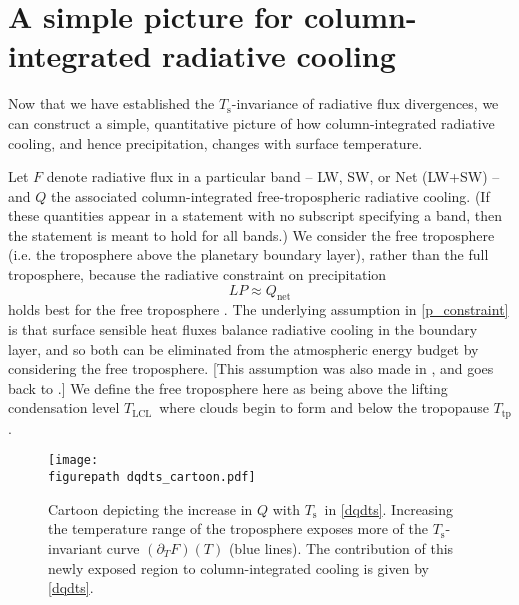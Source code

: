 \documentclass[9pt,twocolumn,twoside,lineno]{pnas-new}
\newcommand{\beqn}{\begin{equation}}
\newcommand{\eeqn}{\end{equation}}
\newcommand{\ppt}{\ensuremath{\partial_T}}
\newcommand{\Qnet}{\ensuremath{Q_\mathrm{net}}}
\newcommand{\Ts}{\ensuremath{T_\mathrm{s}}}
\newcommand{\Tlcl}{\ensuremath{T_\mathrm{LCL}}}
\newcommand{\Ttp}{\ensuremath{T_\mathrm{tp}}}
\newcommand{\figurepath}{./}
\begin{document}
		
\section{A simple picture for column-integrated radiative cooling} \label{sec_simple_Q}

Now that we have established  the \Ts-invariance of radiative flux divergences, we can construct a simple, quantitative picture of how column-integrated radiative cooling, and hence precipitation,  changes with surface temperature. 
	
	Let $F$ denote radiative flux in a particular band -- LW, SW, or Net (LW+SW) -- and $Q$ the associated column-integrated free-tropospheric radiative cooling. (If these quantities appear in a statement with no subscript specifying a band, then the statement is meant to hold for all bands.)  We consider  the free troposphere (i.e. the troposphere above the planetary boundary layer), rather than the full troposphere, because the radiative constraint on precipitation 
		\beqn
			LP \approx \Qnet
		\label{p_constraint}
		\eeqn
		holds best for the free troposphere  \cite{ogorman2012}. The underlying assumption in \eqref{p_constraint} is that surface sensible heat fluxes balance radiative cooling in the boundary layer, and so both can be eliminated from the atmospheric energy budget by considering the free troposphere. [This assumption was also made in \cite{takahashi2009}, and goes back to \cite{betts1989}.] We define the free troposphere here as being above the lifting condensation level \Tlcl\ where clouds begin to form and below the tropopause \Ttp.
	
\begin{figure}[t]
	\begin{center}
			\texttt{[image: \\figurepath dqdts\_cartoon.pdf]}
		\caption{Cartoon depicting the increase in $Q$ with \Ts\ in \eqref{dqdts}. Increasing the temperature range of the troposphere  exposes more of the \Ts-invariant curve $(\ppt F)(T)$ (blue lines). The contribution  of this newly exposed region to column-integrated cooling is given by \eqref{dqdts}.
		\label{dqdts_cartoon}
		}
	\end{center}
\end{figure}
\end{document}
